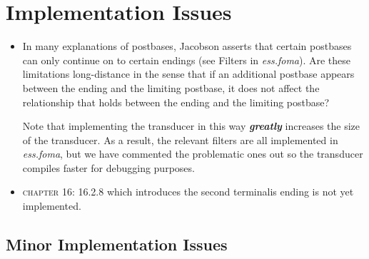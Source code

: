 \documentclass{article}
\begin{document}
\section{Implementation Issues}

\begin{itemize}
\renewcommand\labelitemi{$\cdot$}

\item In many explanations of postbases, Jacobson asserts that certain postbases can only continue on to certain endings (see Filters in \textit{ess.foma}).
%
Are these limitations long-distance in the sense that if an additional postbase appears between the ending and the limiting postbase, it does not affect the relationship that holds between the ending and the limiting postbase?

Note that implementing the transducer in this way \textit{\textbf{greatly}} increases the size of the transducer.
%
As a result, the relevant filters are all implemented in \textit{ess.foma}, but we have commented the problematic ones out so the transducer compiles faster for debugging purposes.

\item \textsc{chapter 16}: 16.2.8 which introduces the second terminalis ending is not yet implemented.

\end{itemize}


\subsection{Minor Implementation Issues}
\end{document}
